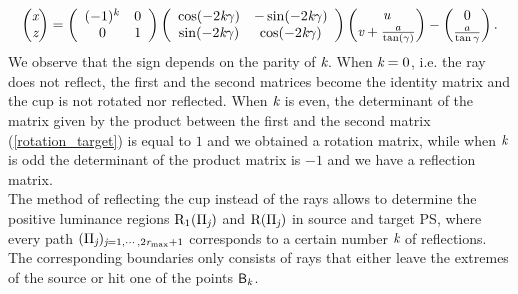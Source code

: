 \begin{equation} \label{rotation_target}\begin{pmatrix} \textit{x}\\ \textit{z}
\end{pmatrix} = \left(\begin{array}{cc}(-1)^k & 0  \\ 0 & 1\end{array}\right)
\left(\begin{array}{cc}\cos(-2\textit{k}\gamma) & -\sin(-2\textit{k}\gamma) \\\sin(-2\textit{k}\gamma) & \cos(-2\textit{k}\gamma)\end{array}\right)\begin{pmatrix} \textit{u} \\
 \textit{v}+\frac{a}{\tan(\gamma)}\end{pmatrix}-\begin{pmatrix}0 \\ \frac{a}{\tan\gamma}\end{pmatrix}.
\end{equation} We observe that the sign depends on the parity of $\textit{k}$. When $\textit{k}=0$, i.e. the ray does not reflect, the first and the second matrices become the identity matrix and the cup is not rotated nor reflected. When $\textit{k}$ is even, the determinant of the matrix given by the product between the first and the second matrix (\ref{rotation_target}) is equal to $1$ and we obtained a rotation matrix, while when $\textit{k}$ is odd the determinant of the product matrix is $-1$ and we have a reflection matrix.
\\ \indent
The method of reflecting the cup instead of the rays allows to determine the positive luminance regions $\mbox{$\textup{R}$}_1(\Pi_{\textit{j}})$ and $\mbox{$\textup{R}$}(\Pi_{\textit{j}})$ in source and target PS, where every path $(\Pi_{\textit{j}})_{\textit{j}=1, \cdots, 2\textit{r}_{\textrm{max}}+1}$ corresponds to a certain number $\textit{k}$ of reflections. The corresponding boundaries only consists of rays that either leave the extremes of the source or hit one of the points $\textsf{B}_{\textit{k}}$. 

